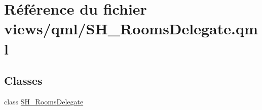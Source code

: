 \hypertarget{SH__RoomsDelegate_8qml}{\section{Référence du fichier views/qml/\-S\-H\-\_\-\-Rooms\-Delegate.qml}
\label{SH__RoomsDelegate_8qml}
}
\subsection*{Classes}
\begin{DoxyCompactItemize}
\item 
class \hyperlink{classSH__RoomsDelegate}{S\-H\-\_\-\-Rooms\-Delegate}
\end{DoxyCompactItemize}
